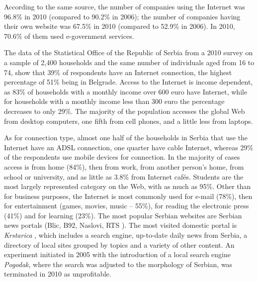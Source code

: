\begin{multicols}{2}

According to the same source, the number of companies using the Internet was 96.8\% in 2010 (compared to 90.2\% in 2006); the number of companies having their own website was 67.5\% in 2010 (compared to 52.9\% in 2006).  In 2010, 70.6\% of them used e-government services. 

The data of the Statistical Office of the Republic of Serbia from a 2010 survey on a sample of 2,400 households and the same number of individuals aged from 16 to 74, show that 39\% of respondents have an Internet connection, the highest percentage of 51\% being in Belgrade. \cite{ICT2010} Access to the Internet is income dependent, as 83\% of households with a monthly income over 600 euro have Internet, while for households with a monthly income less than 300 euro the percentage decreases to only 29\%. The majority of the population accesses the global Web from desktop computers, one fifth from cell phones, and a little less from laptops. 

As for connection type, almost one half of the households in Serbia that use the Internet have an ADSL connection, one quarter have cable Internet, whereas 29\% of the respondents use mobile devices for connection. In the majority of cases access is from home (84\%), then from work, from another person’s home, from school or university, and as little as 3.8\% from Internet caf\'es. Students are the most largely represented category on the Web, with as much as 95\%. Other than for business purposes, the Internet is most commonly used for e-mail (78\%), then for entertainment (games, movies, music – 55\%), for reading the electronic press (41\%) and for learning (23\%). The most popular Serbian websites are Serbian news portals (Blic, \cite{BLIC} B92, \cite{B92} Naslovi, \cite{NASLOVI} RTS \cite{RTS}). The most visited domestic portal is \textit{Krstarica} \cite{KRSTARICA}, which includes a search engine, up-to-date daily news from Serbia, a directory of local sites grouped by topics and a variety of other content. An experiment initiated in 2005 with the introduction of a local search engine \textit{Pogodak}, where the search was adjusted to the morphology of Serbian, was terminated in 2010 as unprofitable.


\end{multicols}
